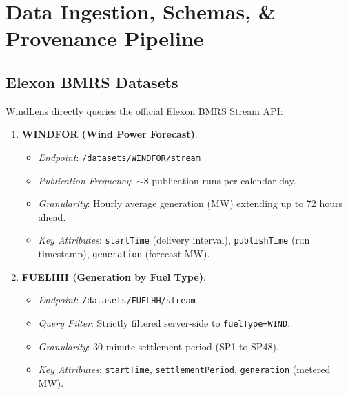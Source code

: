 \documentclass[11pt,a4paper]{article}
\begin{document}
\section{Data Ingestion, Schemas, \& Provenance Pipeline}

\subsection{Elexon BMRS Datasets}
WindLens directly queries the official Elexon BMRS Stream API:
\begin{enumerate}
    \item \textbf{WINDFOR (Wind Power Forecast)}:
    \begin{itemize}
        \item \textit{Endpoint}: \texttt{/datasets/WINDFOR/stream}
        \item \textit{Publication Frequency}: $\sim$8 publication runs per calendar day.
        \item \textit{Granularity}: Hourly average generation (MW) extending up to 72 hours ahead.
        \item \textit{Key Attributes}: \texttt{startTime} (delivery interval), \texttt{publishTime} (run timestamp), \texttt{generation} (forecast MW).
    \end{itemize}
    \item \textbf{FUELHH (Generation by Fuel Type)}:
    \begin{itemize}
        \item \textit{Endpoint}: \texttt{/datasets/FUELHH/stream}
        \item \textit{Query Filter}: Strictly filtered server-side to \texttt{fuelType=WIND}.
        \item \textit{Granularity}: 30-minute settlement period (SP1 to SP48).
        \item \textit{Key Attributes}: \texttt{startTime}, \texttt{settlementPeriod}, \texttt{generation} (metered MW).
    \end{itemize}
\end{enumerate}
\end{document}
